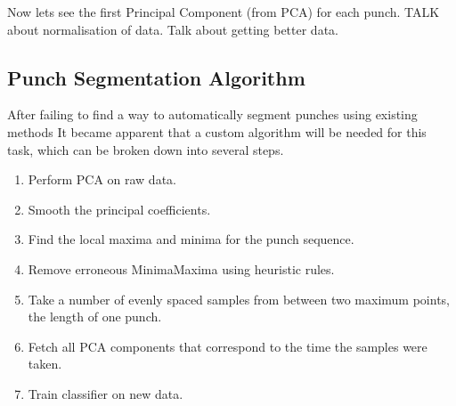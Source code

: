\begin{figure}[h]
\begin{minipage}{6.0cm}
    \centering
    \label{fig:kinect2}
\end{minipage}
\end{figure}

Now lets see the first Principal Component (from PCA) for each punch.
TALK about normalisation of data.
Talk about getting better data.


\subsection{Punch Segmentation Algorithm}
After failing to find a way to automatically segment punches using existing methods It became apparent that a custom algorithm will be needed for this task, which can be broken down into several steps.

\begin{enumerate}[noitemsep]
  \item Perform PCA on raw data.
  \item Smooth the principal coefficients.
  \item Find the local maxima and minima for the punch sequence.
  \item Remove erroneous Minima\/Maxima using heuristic rules.
  \item Take a number of evenly spaced samples from between two maximum points, the length of one punch.
  \item Fetch all PCA components that correspond to the time the samples were taken.
  \item Train classifier on new data.
\end{enumerate}

